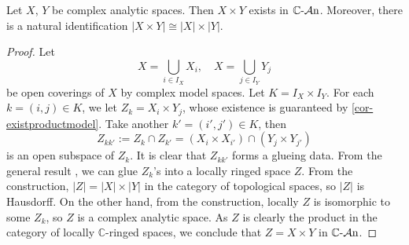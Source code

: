 \begin{corollary}\label{cor-finitedirectproductexist}
    Let $X$, $Y$ be complex analytic spaces. Then $X\times Y$ exists in $\mathbb{C}\text{-}\mathcal{A}\mathrm{n}$. Moreover, there is a natural identification $|X\times Y|\cong |X|\times |Y|$.
\end{corollary}
\begin{proof}
    Let 
    \[
        X=\bigcup_{i\in I_X} X_i,\quad   X=\bigcup_{j\in I_Y} Y_j
    \]
    be open coverings of $X$ by complex model spaces. Let $K=I_X\times I_Y$. For each $k=(i,j)\in K$, we let $Z_k=X_i\times Y_j$, whose existence is guaranteed by \cref{cor-existproductmodel}. Take another $k'=(i',j')\in K$, then 
    \[
        Z_{kk'}:=Z_k\cap Z_{k'}=(X_i\times X_{i'})\cap (Y_{j}\times Y_{j'})
    \]
    is an open subspace of $Z_k$. It is clear that $Z_{kk'}$ forms a glueing data. From the general result \cite[\href{https://stacks.math.columbia.edu/tag/01JB}{Tag 01JB}]{stacks-project}, we can glue $Z_k$'s into a locally ringed space $Z$. From the construction, $|Z|=|X|\times |Y|$ in the category of topological spaces, so $|Z|$ is Hausdorff. On the other hand, from the construction, locally $Z$ is isomorphic to some $Z_k$, so $Z$ is a complex analytic space. As $Z$ is clearly the product in the category of locally $\mathbb{C}$-ringed spaces, we conclude that $Z=X\times Y$ in  $\mathbb{C}\text{-}\mathcal{A}\mathrm{n}$.
\end{proof}

